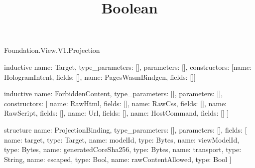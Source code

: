 \begin{lexlean}{Foundation.View.V1.Projection}
\title{Boolean}
\begin{semanticmodule}
inductive{
  name: Target,
  type_parameters: [],
  parameters: [],
  constructors: [{name: HologramIntent, fields: []}, {name: PagesWasmBindgen, fields: []}]
}

inductive{
  name: ForbiddenContent,
  type_parameters: [],
  parameters: [],
  constructors: [
    {name: RawHtml, fields: []},
    {name: RawCss, fields: []},
    {name: RawScript, fields: []},
    {name: Url, fields: []},
    {name: HostCommand, fields: []}
  ]
}

structure{
  name: ProjectionBinding,
  type_parameters: [],
  parameters: [],
  fields: [
    {name: target, type: Target},
    {name: modelId, type: Bytes},
    {name: viewModelId, type: Bytes},
    {name: generatedCoreSha256, type: Bytes},
    {name: transport, type: String},
    {name: escaped, type: Bool},
    {name: rawContentAllowed, type: Bool}
  ]
}
\end{semanticmodule}
\end{lexlean}
